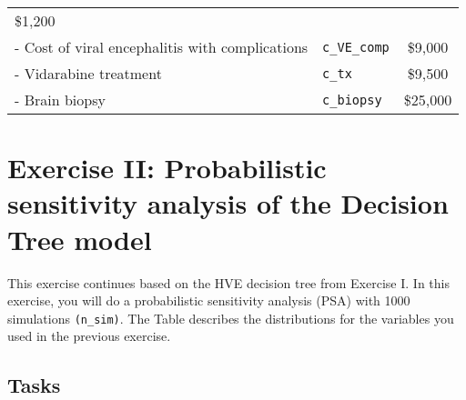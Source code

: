 \documentclass[
]{article}
\begin{document}
\begin{longtable}[]{@{}llc@{}}
\begin{minipage}[t]{0.23\columnwidth}
\$1,200\strut
\end{minipage}\tabularnewline
\begin{minipage}[t]{0.45\columnwidth}\raggedright
- Cost of viral encephalitis with complications\strut
\end{minipage} & \begin{minipage}[t]{0.23\columnwidth}\raggedright
\texttt{c\_VE\_comp}\strut
\end{minipage} & \begin{minipage}[t]{0.23\columnwidth}\centering
\$9,000\strut
\end{minipage}\tabularnewline
\begin{minipage}[t]{0.45\columnwidth}\raggedright
- Vidarabine treatment\strut
\end{minipage} & \begin{minipage}[t]{0.23\columnwidth}\raggedright
\texttt{c\_tx}\strut
\end{minipage} & \begin{minipage}[t]{0.23\columnwidth}\centering
\$9,500\strut
\end{minipage}\tabularnewline
\begin{minipage}[t]{0.45\columnwidth}\raggedright
- Brain biopsy\strut
\end{minipage} & \begin{minipage}[t]{0.23\columnwidth}\raggedright
\texttt{c\_biopsy}\strut
\end{minipage} & \begin{minipage}[t]{0.23\columnwidth}\centering
\$25,000\strut
\end{minipage}\tabularnewline
\bottomrule
\end{longtable}

\hypertarget{exercise-ii-probabilistic-sensitivity-analysis-of-the-decision-tree-model}{%
\section{Exercise II: Probabilistic sensitivity analysis of the Decision
Tree
model}\label{exercise-ii-probabilistic-sensitivity-analysis-of-the-decision-tree-model}}

This exercise continues based on the HVE decision tree from Exercise I.
In this exercise, you will do a probabilistic sensitivity analysis (PSA)
with 1000 simulations \texttt{(n\_sim)}. The Table describes the
distributions for the variables you used in the previous exercise.

\hypertarget{tasks-1}{%
\subsection{Tasks}\label{tasks-1}}
\end{document}
